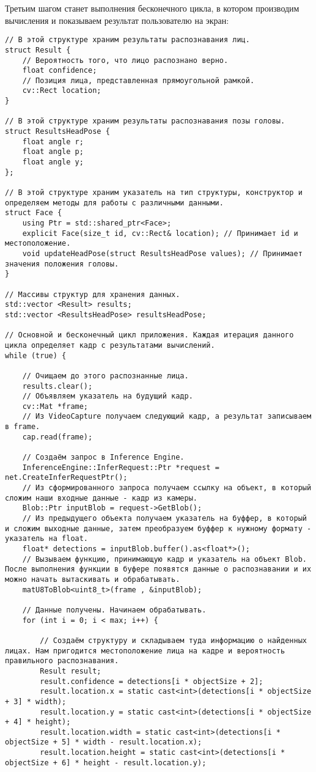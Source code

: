 \documentclass[14pt,a4paper]{scrartcl}
\begin{document}
			Третьим шагом станет выполнения бесконечного цикла, в котором производим вычисления и показываем результат пользователю на экран:
			
			\begin{verbatim}
// В этой структуре храним результаты распознавания лиц.
struct Result {
	// Вероятность того, что лицо распознано верно.
	float confidence;
	// Позиция лица, представленная прямоугольной рамкой.
	cv::Rect location;
}

// В этой структуре храним результаты распознавания позы головы.
struct ResultsHeadPose {
	float angle r;
	float angle p;
	float angle y;
};

// В этой структуре храним указатель на тип структуры, конструктор и определяем методы для работы с различными данными.
struct Face {
	using Ptr = std::shared_ptr<Face>;
	explicit Face(size_t id, cv::Rect& location); // Принимает id и местоположение.
	void updateHeadPose(struct ResultsHeadPose values); // Принимает значения положения головы.
}

// Массивы структур для хранения данных.
std::vector <Result> results;
std::vector <ResultsHeadPose> resultsHeadPose;

// Основной и бесконечный цикл приложения. Каждая итерация данного цикла определяет кадр с результатами вычислений.
while (true) {

	// Очищаем до этого распознанные лица.
	results.clear();
	// Объявляем указатель на будущий кадр.
	cv::Mat *frame;
	// Из VideoCapture получаем следующий кадр, а результат записываем в frame.
	cap.read(frame);
	
	// Создаём запрос в Inference Engine.
	InferenceEngine::InferRequest::Ptr *request = net.CreateInferRequestPtr();
	// Из сформированного запроса получаем ссылку на объект, в который сложим наши входные данные - кадр из камеры.
	Blob::Ptr inputBlob = request->GetBlob();
	// Из предыдущего объекта получаем указатель на буффер, в который и сложим выходные данные, затем преобразуем буффер к нужному формату - указатель на float.
	float* detections = inputBlob.buffer().as<float*>();
	// Вызываем функцию, принимающую кадр и указатель на объект Blob. После выполнения функции в буфере появятся данные о распознавании и их можно начать вытаскивать и обрабатывать.
	matU8ToBlob<uint8_t>(frame , &inputBlob);
	
	// Данные получены. Начинаем обрабатывать.
	for (int i = 0; i < max; i++) {
	
		// Создаём структуру и складываем туда информацию о найденных лицах. Нам пригодится местоположение лица на кадре и вероятность правильного распознавания.
		Result result;
		result.confidence = detections[i * objectSize + 2];
		result.location.x = static cast<int>(detections[i * objectSize + 3] * width);
		result.location.y = static cast<int>(detections[i * objectSize + 4] * height);
		result.location.width = static cast<int>(detections[i * objectSize + 5] * width - result.location.x);
		result.location.height = static cast<int>(detections[i * objectSize + 6] * height - result.location.y);
		

\end{verbatim}
\end{document}
